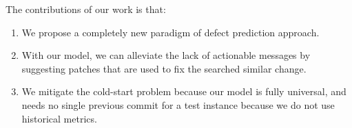\vspace{3mm}
The contributions of our work is that:
\begin{enumerate}
    \item We propose a completely new paradigm of defect prediction approach.
    \item With our model, we can alleviate the lack of actionable messages by suggesting patches that are used to fix the searched similar change.
    \item We mitigate the cold-start problem because our model is fully universal, and needs no single previous commit for a test instance because we do not use historical metrics.
\end{enumerate}